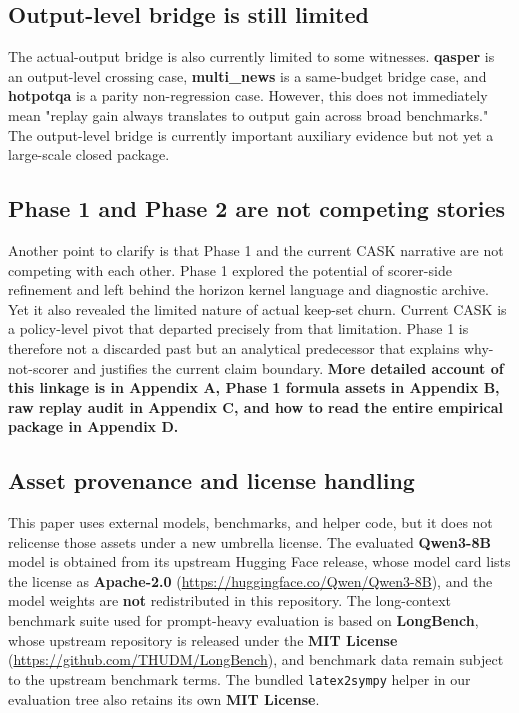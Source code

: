 \subsection{Output-level bridge is still limited}


The actual-output bridge is also currently limited to some witnesses. \textbf{qasper} is an output-level crossing case, \textbf{multi\_news} is a same-budget bridge case, and \textbf{hotpotqa} is a parity non-regression case. However, this does not immediately mean "replay gain always translates to output gain across broad benchmarks." The output-level bridge is currently important auxiliary evidence but not yet a large-scale closed package.


\subsection{Phase 1 and Phase 2 are not competing stories}


Another point to clarify is that Phase 1 and the current CASK narrative are not competing with each other. Phase 1 explored the potential of scorer-side refinement and left behind the horizon kernel language and diagnostic archive. Yet it also revealed the limited nature of actual keep-set churn. Current CASK is a policy-level pivot that departed precisely from that limitation. Phase 1 is therefore not a discarded past but an analytical predecessor that explains why-not-scorer and justifies the current claim boundary. \textbf{More detailed account of this linkage is in Appendix A, Phase 1 formula assets in Appendix B, raw replay audit in Appendix C, and how to read the entire empirical package in Appendix D.}


\subsection{Asset provenance and license handling}


This paper uses external models, benchmarks, and helper code, but it does not relicense those assets under a new umbrella license. \CASKRepoLicenseSentence The evaluated \textbf{Qwen3-8B} model is obtained from its upstream Hugging Face release, whose model card lists the license as \textbf{Apache-2.0} (\url{https://huggingface.co/Qwen/Qwen3-8B}), and the model weights are \textbf{not} redistributed in this repository. The long-context benchmark suite used for prompt-heavy evaluation is based on \textbf{LongBench}, whose upstream repository is released under the \textbf{MIT License} (\url{https://github.com/THUDM/LongBench}), and benchmark data remain subject to the upstream benchmark terms. The bundled \texttt{latex2sympy} helper in our evaluation tree also retains its own \textbf{MIT License}.


